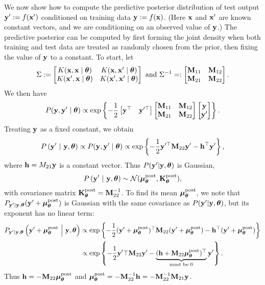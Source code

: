 We now show how to compute the predictive posterior distribution of test output $\yprime := f(\xprime)$ conditioned on training data $\ybf := f(\xbf)$.  (Here $\xbf$ and $\xprime$ are known constant vectors, and we are conditioning on an observed value of $\ybf$.) The predictive posterior can be computed by first forming the joint density when both training and test data are treated as randomly chosen from the prior, then fixing the value of $\ybf$ to a constant.  To start, let
\[
  \Sigma := \bmat{
    K(\xbf, \xbf \midtheta )     & K(\xbf, \xprime \midtheta )     \\
    K(\xprime, \xbf \midtheta ) & K(\xprime, \xprime \midtheta )
  }
  \text{ and }
  \Sigma^{-1} =: \bmat{
    \Mbf_{11} & \Mbf_{12} \\
    \Mbf_{21} & \Mbf_{22}
  }.
\]
We then have
\[
  P(\ybf, \yprime \midtheta )
  \propto
  \exp\br{
    -\frac12
    \bmat{\ybf^\top & \yprimetop}
    \bmat{\Mbf_{11} & \Mbf_{12} \\ \Mbf_{21} & \Mbf_{22}}
    \bmat{\ybf \\ \yprime}
  }.
\]
Treating $\ybf$ as a fixed constant, we obtain
\[
  P\pn{\yprime \mvert \ybf,\thetabf}
  \propto
  P(\ybf, \yprime \midtheta )
  \propto
  \exp\br{
    -\frac12 \yprimetop \Mbf_{22} \yprime
    - \hbf^\top \yprime
  },
\]
where $\hbf = M_{21} \ybf$ is a constant vector.  Thus $P(\yprime | \ybf,
\thetabf)$ is Gaussian,
\begin{equation}\label{eq:pred_posterior}
  P\pn{\yprime \mvert \ybf, \thetabf} \sim \Ncal(\mupost,
\Kbf_{\thetabf}^\text{post}),
\end{equation}
with covariance matrix $\Kpost = \Mbf_{22}^{-1}$.  To find its mean $\mupost$,
we note that $P_{\yprime|\ybf,\thetabf}(\yprime + \mupost)$ is Gaussian with
the same covariance as $P(\yprime | \ybf,\thetabf)$, but its exponent has no linear term:
\begin{align*}
  P_{\yprime|\ybf,\thetabf} \pn{\yprime + \mupost \mvert \ybf,\thetabf}
  &\propto
  \exp\br{
    -\frac12 (\yprime + \mupost)^\top \Mbf_{22} (\yprime + \mupost)
    - \hbf^\top (\yprime + \mupost)
  } \\
  &\propto
  \exp\br{
    -\frac12 \yprime\top \Mbf_{22} \yprime
    - \underbrace{(\hbf + \Mbf_{22} \mupost)^\top}_{\text{must be $0$}} \yprime
  }.
\end{align*}
Thus $\hbf = -\Mbf_{22} \mupost$ and $\mupost = -\Mbf_{22}^{-1} \hbf =
-\Mbf_{22}^{-1} \Mbf_{21} \ybf$.

